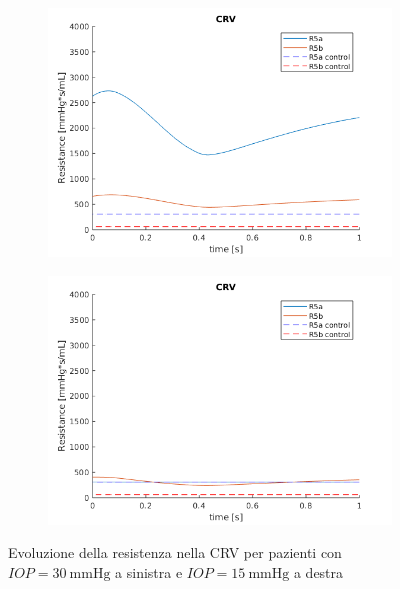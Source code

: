 \documentclass{article}
\begin{document}
\begin{figure}[h]
\begin{subfigure}{.5\textwidth}
  \centering
  \includegraphics[width=1.0\linewidth]{Pictures/IOP30_part1/CRV_30.png}
\end{subfigure}
\begin{subfigure}{.5\textwidth}
  \centering
  \includegraphics[width=1.0\linewidth]{Pictures/IOP15_part1/CRV_15.png}
\end{subfigure}
\caption{Evoluzione della resistenza nella CRV per pazienti con $IOP = \SI{30}{\mmHg}$ a sinistra e $IOP = \SI{15}{\mmHg}$ a destra}
\label{CRV1530}
\end{figure}
\end{document}
